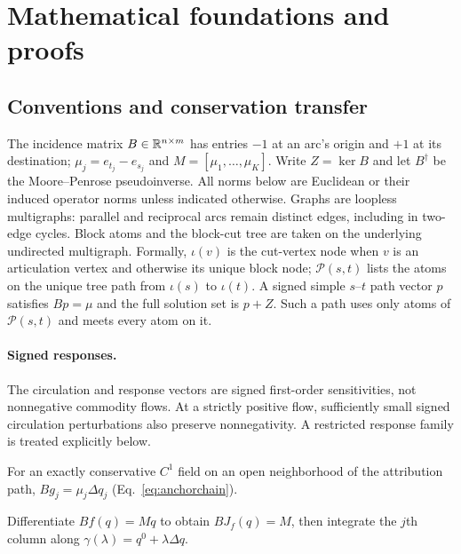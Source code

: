 \section{Mathematical foundations and proofs}\label{app:proofs}

\subsection{Conventions and conservation transfer}\label{app:notation}
The incidence matrix $B\in\mathbb{R}^{n\times m}$ has entries $-1$ at an arc's
origin and $+1$ at its destination; $\mu_j=e_{t_j}-e_{s_j}$ and
$M=[\mu_1,\ldots,\mu_K]$. Write $Z=\ker B$ and let $B^\dagger$ be the
Moore--Penrose pseudoinverse. All norms below are Euclidean or their
induced operator norms unless indicated otherwise. Graphs are loopless
multigraphs: parallel and reciprocal arcs remain distinct edges, including
in two-edge cycles. Block atoms and the block-cut tree are taken on the
underlying undirected multigraph. Formally, $\iota(v)$ is the cut-vertex
node when $v$ is an articulation vertex and otherwise its unique block
node; $\mathcal P(s,t)$ lists the atoms on the unique tree path from
$\iota(s)$ to $\iota(t)$. A signed simple $s$--$t$ path vector $p$ satisfies
$Bp=\mu$ and the full solution set is $p+Z$. Such a path uses only atoms
of $\mathcal P(s,t)$ and meets every atom on it.

\paragraph{Signed responses.}\label{app:signed}
The circulation and response vectors are signed first-order sensitivities,
not nonnegative commodity flows. At a strictly positive flow, sufficiently
small signed circulation perturbations also preserve nonnegativity. A
restricted response family is treated explicitly below.

\begin{corollary}[IG exchange]\label{cor:ig}
For an exactly conservative $C^1$ field on an open neighborhood of the
attribution path, $Bg_j=\mu_j\Delta q_j$ (Eq.~\eqref{eq:anchorchain}).
\end{corollary}
\begin{pf}
Differentiate $Bf(q)=Mq$ to obtain $BJ_f(q)=M$, then integrate the
$j$th column along $\gamma(\lambda)=q^0+\lambda\Delta q$.
\end{pf}

